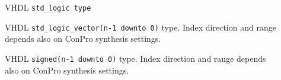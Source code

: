 \documentclass[a4paper,12pt,twoside,english]{article}
\def\s{\hskip 1.15 ex}
\begin{document}
\begin{description}
\begin{description}
\item[] $ $\\
VHDL {\tt std\_logic type} 

\item[] $ $\\
VHDL {\tt std\_logic\_vector(n-1 downto 0)} type. Index direction and range depends also on ConPro synthesis settings.

\item[] $ $\\
VHDL {\tt signed(n-1 downto 0)}  type. Index direction and range depends also on ConPro synthesis settings.


\end{description}
\item[\colorit{\bf Example}]
\def\prefskipu{}\def\prefskipo{}\def\prefskipa{}\def\prefskipu{\hskip10pt}\def\prefskipo{\hskip10pt}\def\prefskipa{\hskip20pt}\def\content{
\vskip-5pt{\parindent0pt\parbox{\linewidth}{\tt\smallsize\hskip10pt \#signals}}
\vskip-5pt{\parindent0pt\parbox{\linewidth}{\tt\smallsize\hskip10pt begin}}
\vskip-5pt{\parindent0pt\parbox{\linewidth}{\tt\smallsize\hskip10pt \s \s --}}
\vskip-5pt{\parindent0pt\parbox{\linewidth}{\tt\smallsize\hskip10pt \s \s --\s Implementation\s signals}}
\vskip-5pt{\parindent0pt\parbox{\linewidth}{\tt\smallsize\hskip10pt \s \s --}}
\vskip-5pt{\parindent0pt\parbox{\linewidth}{\tt\smallsize\hskip10pt \s \s signal\s F\_\$O\_d\_in:\s std\_logic;}}
\vskip-5pt{\parindent0pt\parbox{\linewidth}{\tt\smallsize\hskip10pt \s \s signal\s F\_\$O\_data\_shift:\s std\_logic\_vector{[}\$datawidth{]};}}
\vskip-5pt{\parindent0pt\parbox{\linewidth}{\tt\smallsize\hskip10pt \s \s signal\s F\_\$O\_data:\s std\_logic\_vector{[}\$datawidth*2-1{]};}}
\vskip-5pt{\parindent0pt\parbox{\linewidth}{\tt\smallsize\hskip10pt \s \s signal\s F\_\$O\_shift:\s std\_logic;\s }}
\vskip-5pt{\parindent0pt\parbox{\linewidth}{\tt\smallsize\hskip10pt \s \s signal\s F\_\$O\_init:\s std\_logic;\s }}
\vskip-5pt{\parindent0pt\parbox{\linewidth}{\tt\smallsize\hskip10pt \s \s signal\s F\_\$O\_avail:\s std\_logic;}}
\vskip-5pt{\parindent0pt\parbox{\linewidth}{\tt\smallsize\hskip10pt \s \s }}
\vskip-5pt{\parindent0pt\parbox{\linewidth}{\tt\smallsize\hskip10pt \s \s foreach\s \$p\s in\s \$P.read\s do\s }}
\vskip-5pt{\parindent0pt\parbox{\linewidth}{\tt\smallsize\hskip10pt \s \s begin}}
\vskip-5pt{\parindent0pt\parbox{\linewidth}{\tt\smallsize\hskip10pt \s \s \s \s signal\s F\_\$O\_\$p\_RE:\s std\_logic;}}
\vskip-5pt{\parindent0pt\parbox{\linewidth}{\tt\smallsize\hskip10pt \s \s \s \s signal\s F\_\$O\_\$p\_RD:\s std\_logic\_vector{[}\$datawidth{]};}}
}
\end{description}
\end{document}
